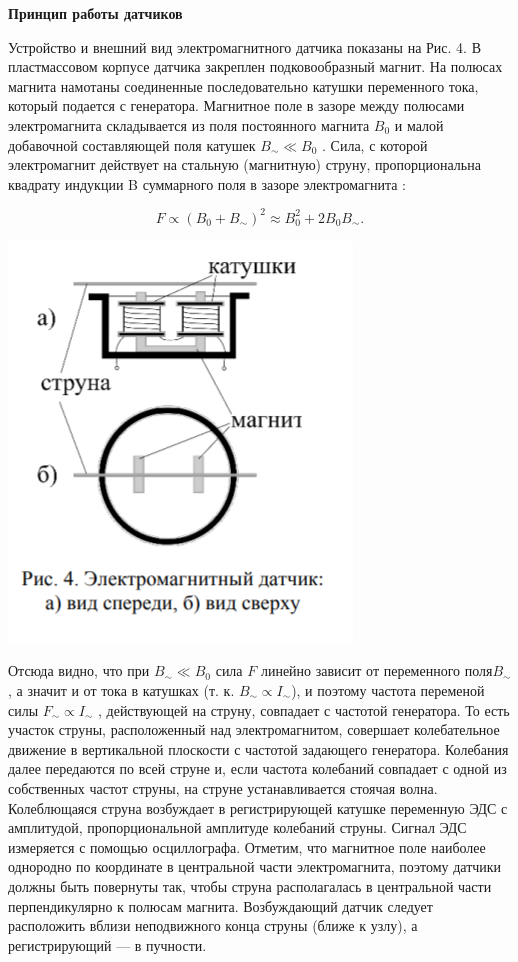 \documentclass[a4paper,12pt]{article} %
\begin{document}
{\bf Принцип работы датчиков}

Устройство и внешний вид электромагнитного датчика показаны на Рис. 4.
В пластмассовом корпусе датчика закреплен подковообразный магнит. На полюсах
магнита намотаны соединенные последовательно катушки переменного тока, который подается с генератора. Магнитное
поле в зазоре между полюсами электромагнита складывается из поля постоянного
магнита $B_0$ и малой добавочной составляющей поля катушек $B_{\sim} \ll B_0$ . Сила, с которой электромагнит действует на стальную
(магнитную) струну, пропорциональна
квадрату индукции B суммарного поля в
зазоре электромагнита :

\[ F\propto (B_0+ B_{\sim})^2 \approx B_0^2 + 2B_0B_{\sim} .\]

\begin{center}
\includegraphics[scale=0.8]{1.4.5 5}
\end{center}

Отсюда видно, что при $B_{\sim} \ll B_0$ сила $F$ линейно зависит от переменного
поля$B_{\sim}$ , а значит и от тока в катушках (т. к. $B_{\sim}  \propto I_{\sim}$), и поэтому частота переменой силы $ F_{\sim} \propto I_{\sim}$ , действующей на струну, совпадает с частотой генератора. То есть участок струны, расположенный над электромагнитом, совершает колебательное движение в вертикальной плоскости с частотой задающего генератора. Колебания далее передаются по всей струне и,
если частота колебаний совпадает с одной из собственных частот струны, на
струне устанавливается стоячая волна. Колеблющаяся струна возбуждает в
регистрирующей катушке переменную ЭДС с амплитудой, пропорциональной амплитуде колебаний струны. Сигнал ЭДС измеряется с помощью осциллографа.
Отметим, что магнитное поле наиболее однородно по координате в центральной части электромагнита, поэтому датчики должны быть повернуты
так, чтобы струна располагалась в центральной части перпендикулярно к полюсам магнита. Возбуждающий датчик следует расположить вблизи неподвижного конца струны (ближе к узлу), а регистрирующий — в пучности.
\end{document}
